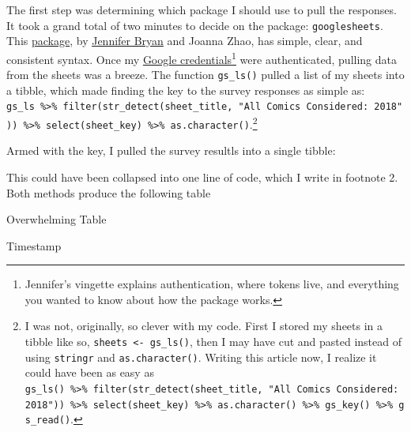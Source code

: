 \documentclass[]{article}
\newenvironment{Shaded}{\begin{snugshade}}{\end{snugshade}}
\newcommand{\KeywordTok}[1]{\textcolor[rgb]{0.13,0.29,0.53}{\textbf{#1}}}
\newcommand{\DecValTok}[1]{\textcolor[rgb]{0.00,0.00,0.81}{#1}}
\newcommand{\StringTok}[1]{\textcolor[rgb]{0.31,0.60,0.02}{#1}}
\newcommand{\OperatorTok}[1]{\textcolor[rgb]{0.81,0.36,0.00}{\textbf{#1}}}
\newcommand{\NormalTok}[1]{#1}
\let\rmarkdownfootnote\footnote%
\def\footnote{\protect\rmarkdownfootnote}
\begin{document}
The first step was determining which package I should use to pull the
responses. It took a grand total of two minutes to decide on the
package: \texttt{googlesheets}. This
\href{https://cran.r-project.org/web/packages/googlesheets/index.html}{package},
by \href{https://github.com/jennybc/googlesheets}{Jennifer Bryan} and
Joanna Zhao, has simple, clear, and consistent syntax. Once my
\href{https://rawgit.com/jennybc/googlesheets/master/vignettes/managing-auth-tokens.html}{Google
credentials}\footnote{Jennifer's vingette explains authentication, where
  tokens live, and everything you wanted to know about how the package
  works.} were authenticated, pulling data from the sheets was a breeze.
The function \texttt{gs\_ls()} pulled a list of my sheets into a tibble,
which made finding the key to the survey responses as simple as:
\texttt{gs\_ls\ \%\textgreater{}\%\ filter(str\_detect(sheet\_title,\ "All\ Comics\ Considered:\ 2018"))\ \%\textgreater{}\%\ select(sheet\_key)\ \%\textgreater{}\%\ as.character()}.\footnote{I
  was not, originally, so clever with my code. First I stored my sheets
  in a tibble like so, \texttt{sheets\ \textless{}-\ gs\_ls()}, then I
  may have cut and pasted instead of using \texttt{stringr} and
  \texttt{as.character()}. Writing this article now, I realize it could
  have been as easy as
  \texttt{gs\_ls()\ \%\textgreater{}\%\ filter(str\_detect(sheet\_title,\ "All\ Comics\ Considered:\ 2018"))\ \%\textgreater{}\%\ select(sheet\_key)\ \%\textgreater{}\%\ as.character()\ \%\textgreater{}\%\ gs\_key()\ \%\textgreater{}\%\ gs\_read()}.}

Armed with the key, I pulled the survey resultls into a single tibble:

\begin{Shaded}
\end{Shaded}

This could have been collapsed into one line of code, which I write in
footnote 2. Both methods produce the following table

Overwhelming Table

Timestamp
\end{document}
